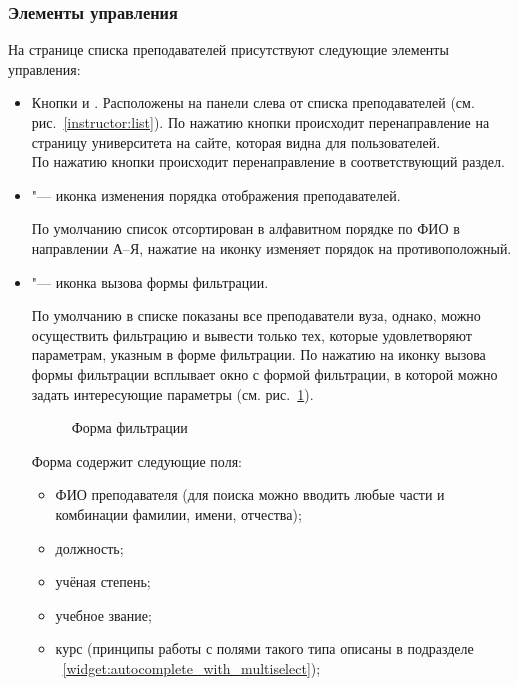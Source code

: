 \subsubsection{Элементы управления}
На странице списка преподавателей присутствуют следующие элементы управления:
\begin{itemize}
	\item Кнопки  и . Расположены на панели слева от списка преподавателей (см. рис.~\ref{instructor:list}). По нажатию кнопки  происходит перенаправление на страницу университета на сайте, которая видна для пользователей. \\
	По нажатию кнопки  происходит перенаправление в соответствующий раздел.
	\item {} "--- иконка изменения порядка отображения преподавателей. 


По умолчанию список отсортирован в алфавитном порядке по ФИО в направлении А--Я, нажатие на иконку изменяет порядок на противоположный.
	\item {} "--- иконка вызова формы фильтрации.

 
По умолчанию в списке показаны все преподаватели вуза, однако, можно осуществить фильтрацию и вывести только тех, которые удовлетворяют параметрам, указным в форме фильтрации. По нажатию на иконку вызова формы фильтрации всплывает окно с формой фильтрации, в которой можно задать интересующие параметры (см. рис.~\ref{instructor:list_filter_form}). 

	\begin{figure}[H]
	\caption{Форма фильтрации}
	\label{instructor:list_filter_form}
	\end{figure}

Форма содержит следующие поля:
\begin{itemize}
	\item ФИО преподавателя (для поиска можно вводить любые части и комбинации фамилии, имени, отчества);
	\item должность;
	\item учёная степень;
	\item учебное звание;
	\item курс (принципы работы с полями такого типа описаны в подразделе ~\ref{widget:autocomplete_with_multiselect});
\end{itemize}	


\end{itemize}
